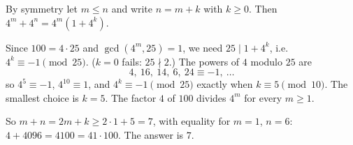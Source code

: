 By symmetry let $m\le n$ and write $n=m+k$ with $k\ge0$. Then $4^m+4^n=4^m\left(1+4^k\right)$.

Since $100=4\cdot25$ and $\gcd(4^m,25)=1$, we need $25\mid1+4^k$, i.e. $4^k\equiv-1\pmod{25}$. ($k=0$ fails: $25\nmid2$.) The powers of $4$ modulo $25$ are
\[
4,\ 16,\ 14,\ 6,\ 24\equiv-1,\ \dots
\]
so $4^5\equiv-1$, $4^{10}\equiv1$, and $4^k\equiv-1\pmod{25}$ exactly when $k\equiv5\pmod{10}$. The smallest choice is $k=5$. The factor $4$ of $100$ divides $4^m$ for every $m\ge1$.

So $m+n=2m+k\ge2\cdot1+5=7$, with equality for $m=1$, $n=6$: $4+4096=4100=41\cdot100$. The answer is $\boxed{7}$.
